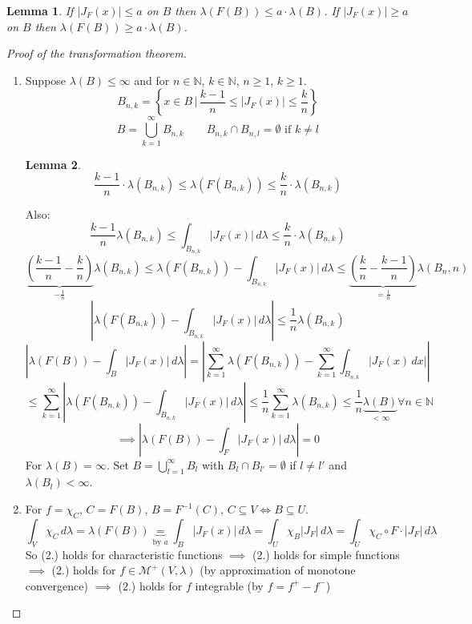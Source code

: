 \documentclass{article}
\newtheorem{lemma}{Lemma}  \numberwithin{lemma}{section}
\newcommand{\setdef}[2]{\left\{\left.#1\,\right|\,#2\right\}}
\newcommand{\card}[1]{\left|#1\right|}
\begin{document}
\begin{lemma}
  If $\card{J_F(x)} \leq a$ on $B$ then $\lambda(F(B)) \leq a \cdot \lambda(B)$.
  If $\card{J_F(x)} \geq a$ on $B$ then $\lambda(F(B)) \geq a \cdot \lambda(B)$.
\end{lemma}
\begin{proof}[Proof of the transformation theorem]\hfill{} \\
  \begin{enumerate}
    \item
      Suppose $\lambda(B) \leq \infty$ and for $n \in \mathbb N$, $k \in \mathbb N$, $n \geq 1$, $k \geq 1$.
      \[ B_{n,k} = \setdef{x \in B}{\frac{k-1}{n} \leq \card{J_F(x)} \leq \frac kn} \]
      \[ B = \bigcup_{k=1}^\infty B_{n,k} \qquad B_{n,k} \cap B_{n,l} = \emptyset \text{ if } k \neq l \]
      \begin{lemma}
        \[ \frac{k-1}{n} \cdot \lambda(B_{n,k}) \leq \lambda(F(B_{n,k})) \leq \frac kn \cdot \lambda(B_{n,k}) \]
      \end{lemma}
      Also:
      \[ \frac{k-1}{n} \lambda(B_{n,k}) \leq \int_{B_{n,k}} \card{J_F(x)} \, d\lambda \leq \frac kn \cdot \lambda(B_{n,k}) \]
      \[ \underbrace{\left(\frac{k-1}{n} - \frac kn\right)}_{-\frac1n} \lambda(B_{n,k}) \leq \lambda(F(B_{n,k})) - \int_{B_{n,k}} \card{J_F(x)} \, d\lambda \leq \underbrace{\left(\frac kn - \frac{k-1}{n}\right)}_{= \frac1n} \lambda(B_n, n) \]
      \[ \card{\lambda(F(B_{n,k})) - \int_{B_{n,k}} \card{J_F(x)} \, d\lambda} \leq \frac1n \lambda(B_{n,k}) \]
      \[ \card{\lambda(F(B)) - \int_B \card{J_F(x)} \, d\lambda} = \card{\sum_{k=1}^\infty \lambda(F(B_{n,k})) - \sum_{k=1}^\infty \int_{B_{n,k}} \card{J_F(x) \, dx}} \]
      \[ \leq \sum_{k=1}^\infty \card{\lambda(F(B_{n,k})) - \int_{B_{n,k}} \card{J_F(x)} \, d\lambda} \leq \frac1n \sum_{k=1}^\infty \lambda(B_{n,k}) \leq \frac1n \underbrace{\lambda(B)}_{<\infty} \forall n \in \mathbb N \]
      \[ \implies \card{\lambda(F(B)) - \int_F \card{J_F(x)} \, d\lambda} = 0 \]
      For $\lambda(B) = \infty$. Set $B = \bigcup_{l=1}^\infty B_l$ with $B_l \cap B_{l'} = \emptyset$ if $l \neq l'$ and $\lambda(B_l) < \infty$.
    \item
      For $f = \chi_C$, $C = F(B)$, $B = F^{-1}(C)$, $C \subseteq V \iff B \subseteq U$.
      \[ \int_V \chi_C \, d\lambda = \lambda(F(B)) \underbrace{=}_{\text{by } a} \int_B \card{J_F(x)} \, d\lambda = \int_U \chi_B \card{J_F} \, d\lambda = \int_U \chi_C \circ  F \cdot \card{J_F} \, d\lambda \]
      So (2.) holds for characteristic functions
      $\implies$ (2.) holds for simple functions
      $\implies$ (2.) holds for $f \in \mathcal M^+(V, \lambda)$ (by approximation of monotone convergence)
      $\implies$ (2.) holds for $f$ integrable (by $f = f^+ - f^-$)
  \end{enumerate}
\end{proof}
\end{document}

